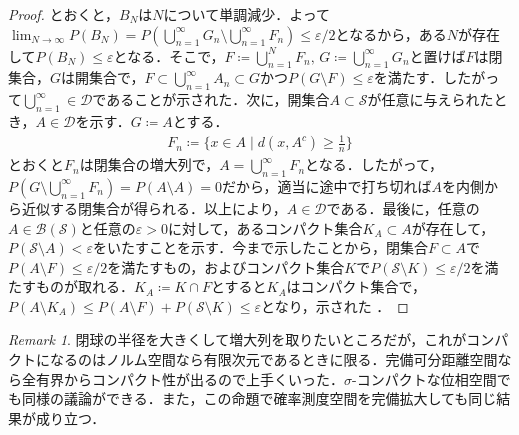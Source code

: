 \documentclass[dvipdfmx,autodetect-engine]{jsarticle}
\theoremstyle{remark}
\newtheorem*{remark}{Remark}
\theoremstyle{definition}
\begin{document}
\begin{proof}
    とおくと，$B_N$は$N$について単調減少．よって$\lim_{N\to\infty} P(B_N) = P(\bigcup_{n=1}^{\infty}G_n \setminus \bigcup_{n=1}^{\infty} F_n ) \leq \varepsilon /2$となるから，ある$N$が存在して$P(B_N) \leq \varepsilon$となる．そこで，$F \coloneqq \bigcup_{n=1}^{N} F_n,\, G \coloneqq \bigcup_{n=1}^{\infty} G_n$と置けば$F$は閉集合，$G$は開集合で，$F \subset \bigcup_{n=1}^{\infty} A_n \subset G$かつ$P(G\setminus F)\leq \varepsilon$を満たす．したがって$\bigcup_{n=1}^{\infty} \in \mathcal{D}$であることが示された．次に，開集合$A \subset \mathcal{S}$が任意に与えられたとき，$A \in \mathcal{D}$を示す．$G\coloneqq A$とする．
    \begin{align*}
        F_n \coloneqq \{x \in A \mid d(x,A^c) \geq \frac{1}{n} \}
    \end{align*}
    とおくと$F_n$は閉集合の増大列で，$A = \bigcup_{n=1}^{\infty} F_n$となる．したがって，$P(G\setminus \bigcup_{n=1}^{\infty} F_n) = P(A\setminus A)=0$だから，適当に途中で打ち切れば$A$を内側から近似する閉集合が得られる．以上により，$A \in \mathcal{D}$である．最後に，任意の$A \in \mathcal{B}(\mathcal{S})$と任意の$\varepsilon>0$に対して，あるコンパクト集合$K_A \subset A$が存在して，$P(\mathcal{S}\setminus A) <\varepsilon$をいたすことを示す．今まで示したことから，閉集合$F \subset A$で$P(A\setminus F) \leq \varepsilon /2$を満たすもの，およびコンパクト集合$K$で$P(\mathcal{S} \setminus K) \leq \varepsilon /2$を満たすものが取れる．$K_A \coloneqq K \cap F$とすると$K_A$はコンパクト集合で，$P(A \setminus K_A) \leq P(A\setminus F) + P(\mathcal{S}\setminus K) \leq \varepsilon$となり，示された
    ．
    \end{proof}
    
    
    \begin{remark}
    閉球の半径を大きくして増大列を取りたいところだが，これがコンパクトになるのはノルム空間なら有限次元であるときに限る．完備可分距離空間なら全有界からコンパクト性が出るので上手くいった．$\sigma$-コンパクトな位相空間でも同様の議論ができる．また，この命題で確率測度空間を完備拡大しても同じ結果が成り立つ．
    \end{remark}
    
\end{document}
